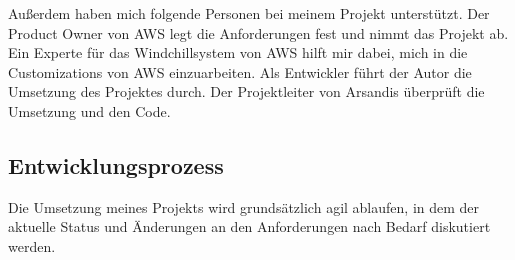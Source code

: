 Außerdem haben mich folgende Personen bei meinem Projekt unterstützt.
Der Product Owner von \acs{AWS} legt die Anforderungen fest und nimmt das Projekt ab.
Ein Experte für das Windchillsystem von \acs{AWS} hilft mir dabei, mich in die Customizations von \acs{AWS} einzuarbeiten.
Als Entwickler führt der Autor die Umsetzung des Projektes durch.
Der Projektleiter von Arsandis überprüft die Umsetzung und den Code.

\subsection{Entwicklungsprozess}
\label{sec:Entwicklungsprozess}

Die Umsetzung meines Projekts wird grundsätzlich agil ablaufen, in dem der aktuelle Status und Änderungen an den Anforderungen nach Bedarf diskutiert werden.
